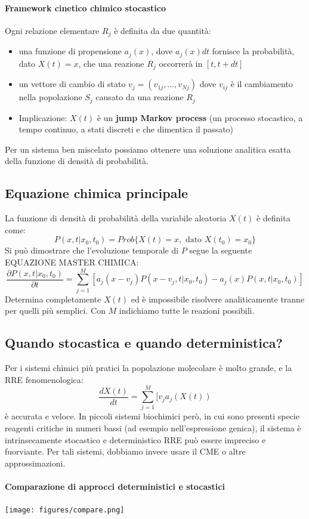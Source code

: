 \documentclass{article}
\begin{document}
\paragraph{Framework cinetico chimico stocastico}
Ogni relazione elementare $R_j$ è definita da due quantità:
\begin{itemize}
    \item una funzione di propensione $a_j(x)$, dove $a_j(x)dt$ fornisce la probabilità, dato $X(t) = x$, che una reazione $R_j$ occorrerà in $[t, t + dt]$
    \item un vettore di cambio di stato $v_j = (v_{1j}, \dots, v_{Nj})$ dove $v_{ij}$ è il cambiamento nella popolazione $S_j$ causato da una reazione $R_j$
    \item Implicazione: $X(t)$ è un \textbf{jump Markov process} (un processo stocastico, a tempo continuo, a stati discreti e che dimentica il passato)
\end{itemize}
Per un sistema ben miscelato possiamo ottenere una soluzione analitica esatta
della funzione di densità di probabilità.
\subsection{Equazione chimica principale}
La funzione di densità di probabilità della variabile aleatoria $X(t)$ è definita come:
$$ P( x,t | x_0, t_0) = Prob \{ X(t) = x, \textrm{ dato } X(t_0) = x_0 \}$$
Si può dimostrare che l'evoluzione temporale di $P$ segue la seguente EQUAZIONE MASTER CHIMICA:
$$\frac{\partial P(x,t|x_0, t_0)}{\partial t} = \sum^M_{j=1}[a_j(x-v_j)P(x-v_j,t | x_0,t_0) -a_j(x)P(x,t | x_0,t_0)]$$
Determina completamente $X(t)$ ed è impossibile risolvere analiticamente tranne per quelli più semplici. Con $M$ indichiamo tutte le reazioni possibili.
\subsection{Quando stocastica e quando deterministica?}
Per i sistemi chimici più pratici la popolazione molecolare è molto grande, e la RRE fenomenologica:
$$\frac{dX(t)}{dt} = \sum^M_{j=1}[v_j a_j (X(t))$$
è accurata e veloce.
In piccoli sistemi biochimici però, in cui sono presenti specie reagenti critiche
in numeri bassi (ad esempio nell'espressione genica), il sistema è intrinsecamente stocastico e deterministico RRE può essere impreciso e fuorviante.
Per tali sistemi, dobbiamo invece usare il CME o altre approssimazioni.
\paragraph{Comparazione di approcci deterministici e stocastici}
\begin{center}
    \texttt{[image: figures/compare.png]}
\end{center}
\end{document}
